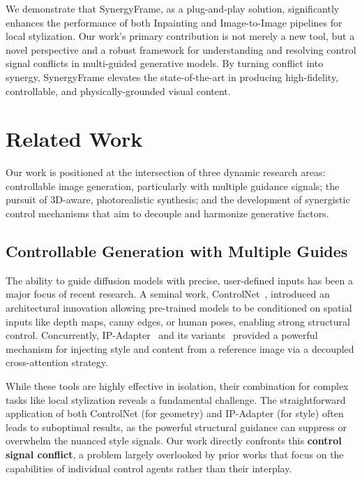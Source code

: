 \documentclass[letterpaper]{article} %
\begin{document}
We demonstrate that SynergyFrame, as a plug-and-play solution, significantly enhances the performance of both Inpainting and Image-to-Image pipelines for local stylization. Our work's primary contribution is not merely a new tool, but a novel perspective and a robust framework for understanding and resolving control signal conflicts in multi-guided generative models. By turning conflict into synergy, SynergyFrame elevates the state-of-the-art in producing high-fidelity, controllable, and physically-grounded visual content.

\section{Related Work}
\label{sec:related_work}

Our work is positioned at the intersection of three dynamic research areas: controllable image generation, particularly with multiple guidance signals; the pursuit of 3D-aware, photorealistic synthesis; and the development of synergistic control mechanisms that aim to decouple and harmonize generative factors.

\subsection{Controllable Generation with Multiple Guides}

The ability to guide diffusion models with precise, user-defined inputs has been a major focus of recent research. A seminal work, ControlNet~\cite{controlnet}, introduced an architectural innovation allowing pre-trained models to be conditioned on spatial inputs like depth maps, canny edges, or human poses, enabling strong structural control. Concurrently, IP-Adapter~\cite{ipadapter} and its variants~\cite{ipadapter_plus} provided a powerful mechanism for injecting style and content from a reference image via a decoupled cross-attention strategy. 

While these tools are highly effective in isolation, their combination for complex tasks like local stylization reveals a fundamental challenge. The straightforward application of both ControlNet (for geometry) and IP-Adapter (for style) often leads to suboptimal results, as the powerful structural guidance can suppress or overwhelm the nuanced style signals. Our work directly confronts this \textbf{control signal conflict}, a problem largely overlooked by prior works that focus on the capabilities of individual control agents rather than their interplay.
\end{document}
